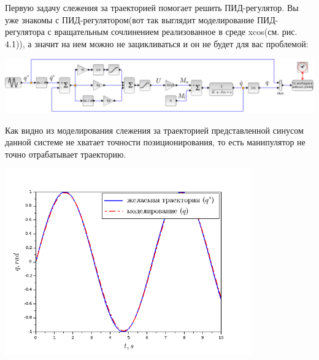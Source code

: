 Первую задачу слежения за траекторией помогает решить ПИД-регулятор. Вы уже знакомы с ПИД-регулятором(вот так выглядит моделирование ПИД-регулятора с вращательным сочлинением реализованное в среде xcos(см. рис. 4.1)), а значит на нем можно не зацикливаться и он не будет для вас проблемой:\\
\begin{center}
    \includegraphics[width=\textwidth]{Lab4/images/Scheme_without.png}\\
\end{center}
\vspace{1cm}
 Как видно из моделирования слежения за траекторией представленной синусом данной системе не хватает точности позиционирования, то есть манипулятор не точно отрабатывает траекторию.\\
 \vspace{1cm}
 \begin{center}
    \includegraphics[width=0.8\textwidth]{Lab4/images/Pict_without.png}\\
\end{center}


